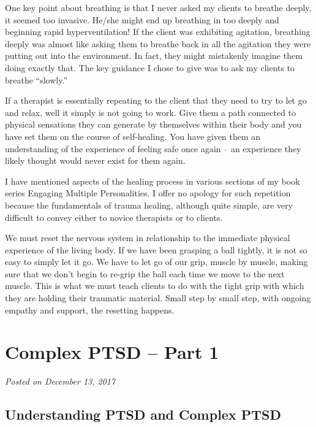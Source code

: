 \documentclass[]{book}
\begin{document}
One key point about breathing is that I never asked my clients to breathe deeply, it seemed too invasive. He/she might end up breathing in too deeply and beginning rapid hyperventilation! If the client was exhibiting agitation, breathing deeply was almost like asking them to breathe back in all the agitation they were putting out into the environment. In fact, they might mistakenly imagine them doing exactly that. The key guidance I chose to give was to ask my clients to breathe ``slowly.''

If a therapist is essentially repeating to the client that they need to try to let go and relax, well it simply is not going to work. Give them a path connected to physical sensations they can generate by themselves within their body and you have set them on the course of self-healing. You have given them an understanding of the experience of feeling safe once again -- an experience they likely thought would never exist for them again.

I have mentioned aspects of the healing process in various sections of my book series Engaging Multiple Personalities. I offer no apology for such repetition because the fundamentals of trauma healing, although quite simple, are very difficult to convey either to novice therapists or to clients.

We must reset the nervous system in relationship to the immediate physical experience of the living body. If we have been grasping a ball tightly, it is not so easy to simply let it go. We have to let go of our grip, muscle by muscle, making sure that we don't begin to re-grip the ball each time we move to the next muscle. This is what we must teach clients to do with the tight grip with which they are holding their traumatic material. Small step by small step, with ongoing empathy and support, the resetting happens.

\hypertarget{complex-ptsd-part-1}{%
\section{Complex PTSD -- Part 1}\label{complex-ptsd-part-1}}

\emph{Posted on December 13, 2017}

\hypertarget{understanding-ptsd-and-complex-ptsd}{%
\subsection*{Understanding PTSD and Complex PTSD}\label{understanding-ptsd-and-complex-ptsd}}
\end{document}
